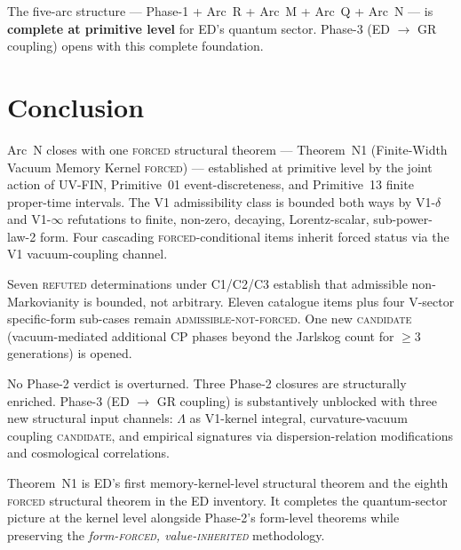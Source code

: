 \documentclass[11pt,a4paper]{article}
\begin{document}
The five-arc structure --- Phase-1 + Arc~R + Arc~M + Arc~Q + Arc~N --- is \textbf{complete at primitive level} for ED's quantum sector. Phase-3 (ED $\to$ GR coupling) opens with this complete foundation.

\section{Conclusion}

Arc~N closes with one \textsc{forced} structural theorem --- Theorem~N1 (Finite-Width Vacuum Memory Kernel \textsc{forced}) --- established at primitive level by the joint action of UV-FIN, Primitive~01 event-discreteness, and Primitive~13 finite proper-time intervals. The V1 admissibility class is bounded both ways by V1-$\delta$ and V1-$\infty$ refutations to finite, non-zero, decaying, Lorentz-scalar, sub-power-law-2 form. Four cascading \textsc{forced}-conditional items inherit forced status via the V1 vacuum-coupling channel.

Seven \textsc{refuted} determinations under C1/C2/C3 establish that admissible non-Markovianity is bounded, not arbitrary. Eleven catalogue items plus four V-sector specific-form sub-cases remain \textsc{admissible-not-forced}. One new \textsc{candidate} (vacuum-mediated additional CP phases beyond the Jarlskog count for $\geq 3$ generations) is opened.

No Phase-2 verdict is overturned. Three Phase-2 closures are structurally enriched. Phase-3 (ED $\to$ GR coupling) is substantively unblocked with three new structural input channels: $\Lambda$ as V1-kernel integral, curvature-vacuum coupling \textsc{candidate}, and empirical signatures via dispersion-relation modifications and cosmological correlations.

Theorem~N1 is ED's first memory-kernel-level structural theorem and the eighth \textsc{forced} structural theorem in the ED inventory. It completes the quantum-sector picture at the kernel level alongside Phase-2's form-level theorems while preserving the \emph{form-\textsc{forced}, value-\textsc{inherited}} methodology.
\end{document}
